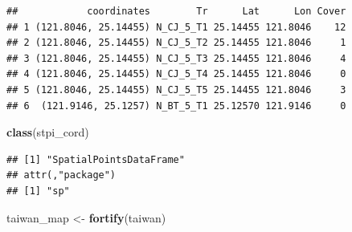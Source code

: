 \documentclass[
]{article}
\newenvironment{Shaded}{\begin{snugshade}}{\end{snugshade}}
\newcommand{\DataTypeTok}[1]{\textcolor[rgb]{0.13,0.29,0.53}{#1}}
\newcommand{\KeywordTok}[1]{\textcolor[rgb]{0.13,0.29,0.53}{\textbf{#1}}}
\newcommand{\NormalTok}[1]{#1}
\newcommand{\OperatorTok}[1]{\textcolor[rgb]{0.81,0.36,0.00}{\textbf{#1}}}
\newcommand{\StringTok}[1]{\textcolor[rgb]{0.31,0.60,0.02}{#1}}
\begin{document}
\begin{Shaded}
\end{Shaded}

\begin{verbatim}
##            coordinates        Tr      Lat      Lon Cover
## 1 (121.8046, 25.14455) N_CJ_5_T1 25.14455 121.8046    12
## 2 (121.8046, 25.14455) N_CJ_5_T2 25.14455 121.8046     1
## 3 (121.8046, 25.14455) N_CJ_5_T3 25.14455 121.8046     4
## 4 (121.8046, 25.14455) N_CJ_5_T4 25.14455 121.8046     0
## 5 (121.8046, 25.14455) N_CJ_5_T5 25.14455 121.8046     3
## 6  (121.9146, 25.1257) N_BT_5_T1 25.12570 121.9146     0
\end{verbatim}

\begin{Shaded}
\begin{Highlighting}[]
\KeywordTok{class}\NormalTok{(stpi_cord)}
\end{Highlighting}
\end{Shaded}

\begin{verbatim}
## [1] "SpatialPointsDataFrame"
## attr(,"package")
## [1] "sp"
\end{verbatim}

\begin{Shaded}
\begin{Highlighting}[]
\NormalTok{taiwan_map <-}\StringTok{ }\KeywordTok{fortify}\NormalTok{(taiwan)}
\end{Highlighting}
\end{Shaded}
\end{document}
